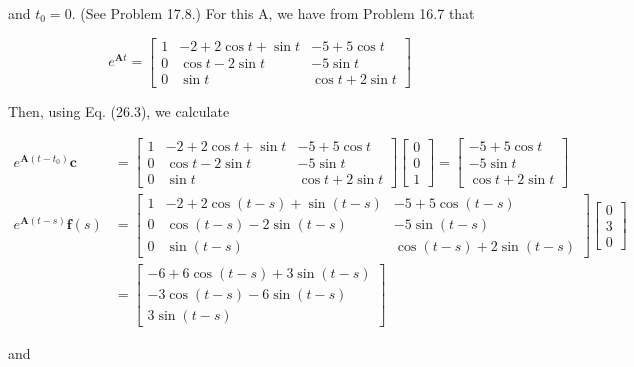 \documentclass[10pt]{article}
\begin{document}
and $t_{0}=0$. (See Problem 17.8.) For this A, we have from Problem 16.7 that

$$
e^{\mathbf{A} t}=\left[\begin{array}{ccc}
1 & -2+2 \cos t+\sin t & -5+5 \cos t \\
0 & \cos t-2 \sin t & -5 \sin t \\
0 & \sin t & \cos t+2 \sin t
\end{array}\right]
$$

Then, using Eq. (26.3), we calculate

$$
\begin{aligned}
e^{\mathbf{A}\left(t-t_{0}\right)} \mathbf{c} & =\left[\begin{array}{ccc}
1 & -2+2 \cos t+\sin t & -5+5 \cos t \\
0 & \cos t-2 \sin t & -5 \sin t \\
0 & \sin t & \cos t+2 \sin t
\end{array}\right]\left[\begin{array}{l}
0 \\
0 \\
1
\end{array}\right]=\left[\begin{array}{c}
-5+5 \cos t \\
-5 \sin t \\
\cos t+2 \sin t
\end{array}\right] \\
e^{\mathbf{A}(t-s)} \mathbf{f}(s) & =\left[\begin{array}{ccc}
1 & -2+2 \cos (t-s)+\sin (t-s) & -5+5 \cos (t-s) \\
0 & \cos (t-s)-2 \sin (t-s) & -5 \sin (t-s) \\
0 & \sin (t-s) & \cos (t-s)+2 \sin (t-s)
\end{array}\right]\left[\begin{array}{l}
0 \\
3 \\
0
\end{array}\right] \\
& =\left[\begin{array}{c}
-6+6 \cos (t-s)+3 \sin (t-s) \\
-3 \cos (t-s)-6 \sin (t-s) \\
3 \sin (t-s)
\end{array}\right]
\end{aligned}
$$

and
\end{document}
